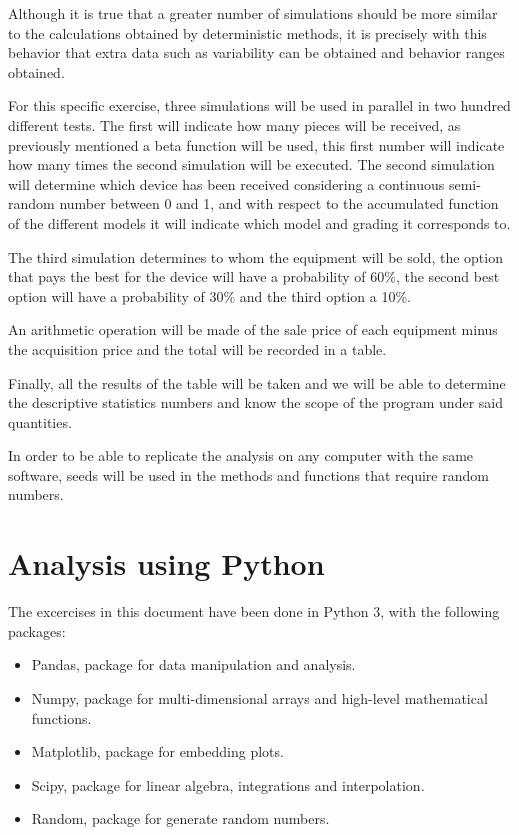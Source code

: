 \documentclass[11pt,a4paper,twocolumn]{article}
\begin{document}
Although it is true that a greater number of simulations should be more similar to the calculations obtained by deterministic methods, it is precisely with this behavior that extra data such as variability can be obtained and behavior ranges obtained.

For this specific exercise, three simulations will be used in parallel in two hundred different tests. The first will indicate how many pieces will be received, as previously mentioned a beta function will be used, this first number will indicate how many times the second simulation will be executed. The second simulation will determine which device has been received considering a continuous semi-random number between 0 and 1, and with respect to the accumulated function of the different models it will indicate which model and grading it corresponds to.

The third simulation determines to whom the equipment will be sold, the option that pays the best for the device will have a probability of 60\%, the second best option will have a probability of 30\% and the third option a 10\%.

An arithmetic operation will be made of the sale price of each equipment minus the acquisition price and the total will be recorded in a table.

Finally, all the results of the table will be taken and we will be able to determine the descriptive statistics numbers and know the scope of the program under said quantities.

In order to be able to replicate the analysis on any computer with the same software, seeds will be used in the methods and functions that require random numbers.

\section{Analysis using Python}

The excercises in this document have been done in Python 3, with the following packages:
\begin{itemize}
    \item Pandas, package for data manipulation and analysis.
    \item Numpy, package for multi-dimensional arrays and high-level mathematical functions.
    \item Matplotlib, package for embedding plots.
    \item Scipy, package for linear algebra, integrations and interpolation.
    \item Random, package for generate random numbers.
\end{itemize}
\end{document}
